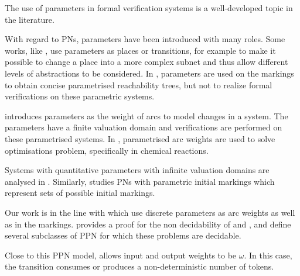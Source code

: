 The use of parameters in formal verification systems is a well-developed topic in the literature.

With regard  to \acp{PN}, parameters have been introduced with many roles.
Some works, like \cite{Christensen97}, use parameters as places or transitions, for example to make it possible to change a place into a more complex subnet and thus allow different levels of abstractions to be considered.
In \cite{Lindqvist91}, parameters are used on the markings to obtain concise parametrised reachability trees, but not to realize formal verifications on these parametric systems.

\cite{Badouel99} introduces parameters as the weight of arcs to model changes in a system.
The parameters have a finite valuation domain and verifications are performed on these parametrised systems.
In \cite{watel2017parameterized}, parametrised arc weights are used to solve optimisations problem, specifically in chemical reactions.

Systems with quantitative parameters with infinite valuation domains are analysed in \cite{Abdulla13}.
Similarly, \cite{Marsan94} studies \acp{PN} with parametric initial markings which represent sets of possible initial markings.

Our work is in the line with \cite{David17} which use discrete parameters as arc weights as well as in the markings.
\cite{David17} provides a proof for the non decidability of \Ucov and \Ecov, and define several subclasses of \ac{PPN} for which these problems are decidable.

Close to this \ac{PPN} model, \opn \citep{Geeraerts15} allows input and output weights to be $\omega$.
In this case, the transition consumes or produces a non-deterministic number of tokens.
